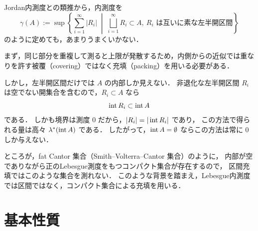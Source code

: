 

\begin{remark}[区間による内側近似がうまくいかない理由]
Jordan内測度との類推から，内測度を
\[
\gamma(A) := 
\sup\left\{ \sum_{i=1}^\infty |R_i| \;\middle|\; \bigsqcup_{i=1}^\infty R_i \subset A,\ R_i \text{ は互いに素な左半開区間}\right\}
\]
のように定めても，あまりうまくいかない．

まず，同じ部分を重複して測ると上限が発散するため，内側からの近似では重なりを許す被覆（covering）ではなく充填（packing）を用いる必要がある．

しかし，左半開区間だけでは $A$ の内部しか見えない．
非退化な左半開区間 $R_i$ は空でない開集合を含むので，$R_i \subset A$ なら
\[
\operatorname{int} R_i \subset \operatorname{int} A
\]
である．
しかも境界は測度 $0$ だから，$|R_i|=|\operatorname{int} R_i|$ であり，
この方法で得られる量は高々 $\lambda^*(\operatorname{int} A)$ である．
したがって，$\operatorname{int} A=\emptyset$ ならこの方法は常に $0$ しか与えない．

ところが，fat Cantor 集合（Smith--Volterra--Cantor 集合）のように，
内部が空でありながら正のLebesgue測度をもつコンパクト集合が存在するので，
区間充填ではこのような集合を測れない．
このような背景を踏まえ，Lebesgue内測度では区間ではなく，コンパクト集合による充填を用いる．
\end{remark}

\section{基本性質}

